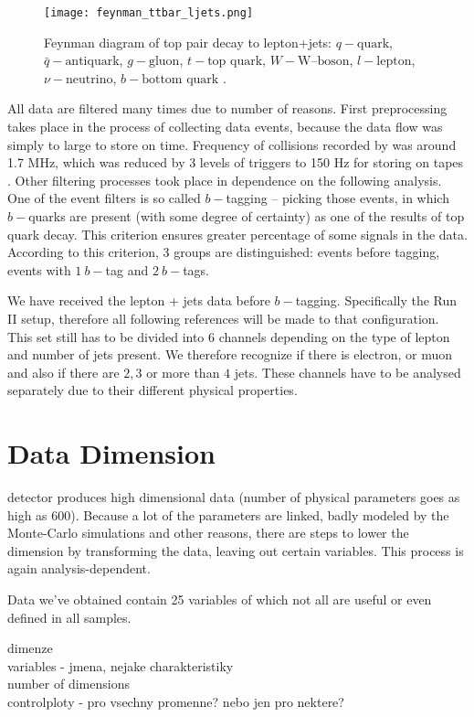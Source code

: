 \begin{figure}[htb]
    \centering
	\texttt{[image: feynman\_ttbar\_ljets.png]}
    \caption{Feynman diagram of top pair decay to lepton+jets: 
    $q - \text{quark}$,
    $\bar{q} - \text{antiquark}$,
	$g - \text{gluon}$,
	$t - \text{top quark}$,
    $W - \text{W--boson}$,
    $l - \text{lepton}$,
    $\nu - \text{neutrino}$,
    $b - \text{bottom quark}$ \cite{Heinson}.}
   	\label{fig:feynman-ljets}
\end{figure} 

All data are filtered many times due to number of reasons. First preprocessing takes  place in the process of collecting data events, because the data flow was simply to large to store on time. Frequency of collisions recorded by \dzero was around 1.7 MHz, which was reduced by 3 levels of triggers to 150 Hz for storing on tapes \cite{Yuntse}. Other filtering processes took place in dependence on the following analysis. One of the event filters is so called $b-$tagging -- picking those events, in which $b-$quarks are present (with some degree of certainty) as one of the results of top quark decay. This criterion ensures greater percentage of some signals in the data. According to this criterion, 3 groups are distinguished: events before tagging, events with $1\: b-$tag and $2\: b-$tags.

We have received the lepton + jets data before $b-$tagging. Specifically the Run II setup, therefore all following references will be made to that configuration. This set still has to be divided into 6 channels depending on the type of lepton and number of jets present. We therefore recognize if there is electron, or muon and also if there are $2, 3$ or more than $4$ jets. These channels have to be analysed separately due to their different physical properties.

\section{Data Dimension}
\dzero detector  produces high dimensional data (number of physical parameters  goes as high as $600$). Because a lot of the parameters are linked, badly modeled by the Monte-Carlo simulations and other reasons, there are steps to lower the dimension by transforming the data, leaving out certain variables. This process is again analysis-dependent.

Data we've obtained contain 25 variables of which not all are useful or even defined in all samples. 


dimenze\\
variables - jmena, nejake charakteristiky\\
number of dimensions\\
controlploty - pro vsechny promenne? nebo jen pro nektere?\\


